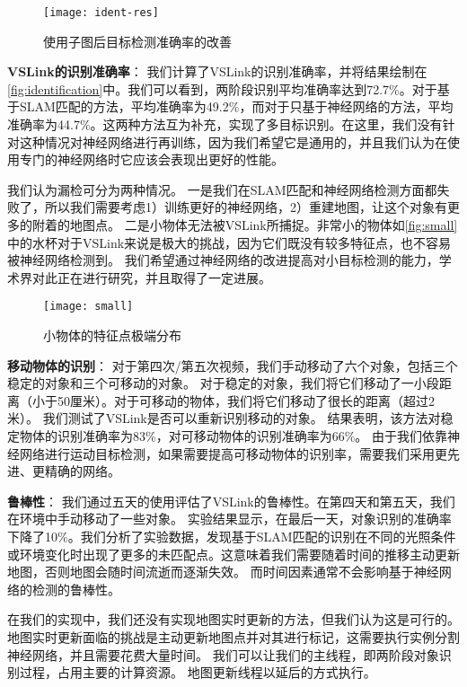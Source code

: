 \begin{figure*}[htbp]
	\centering
	\texttt{[image: ident-res]}
	\caption{使用子图后目标检测准确率的改善}
	\label{fig:identification}
\end{figure*}

\textbf{VSLink的识别准确率}：
我们计算了VSLink的识别准确率，并将结果绘制在\autoref{fig:identification}中。我们可以看到，两阶段识别平均准确率达到72.7\%。对于基于SLAM匹配的方法，平均准确率为49.2\%，而对于只基于神经网络的方法，平均准确率为44.7\%。这两种方法互为补充，实现了多目标识别。在这里，我们没有针对这种情况对神经网络进行再训练，因为我们希望它是通用的，并且我们认为在使用专门的神经网络时它应该会表现出更好的性能。

我们认为漏检可分为两种情况。
一是我们在SLAM匹配和神经网络检测方面都失败了，所以我们需要考虑1）训练更好的神经网络，2）重建地图，让这个对象有更多的附着的地图点。
二是小物体无法被VSLink所捕捉。非常小的物体如\autoref{fig:small}中的水杯对于VSLink来说是极大的挑战，因为它们既没有较多特征点，也不容易被神经网络检测到。
我们希望通过神经网络的改进提高对小目标检测的能力，学术界对此正在进行研究，并且取得了一定进展。
\begin{figure}[htbp]
	\centering
	\texttt{[image: small]}
	\caption{小物体的特征点极端分布}
	\label{fig:small}
\end{figure}

\textbf{移动物体的识别}：
对于第四次/第五次视频，我们手动移动了六个对象，包括三个稳定的对象和三个可移动的对象。
对于稳定的对象，我们将它们移动了一小段距离（小于50厘米）。对于可移动的物体，我们将它们移动了很长的距离（超过2米）。
我们测试了VSLink是否可以重新识别移动的对象。
结果表明，该方法对稳定物体的识别准确率为83\%，对可移动物体的识别准确率为66\%。
由于我们依靠神经网络进行运动目标检测，如果需要提高可移动物体的识别率，需要我们采用更先进、更精确的网络。


\textbf{鲁棒性}：
我们通过五天的使用评估了VSLink的鲁棒性。在第四天和第五天，我们在环境中手动移动了一些对象。
实验结果显示，在最后一天，对象识别的准确率下降了10\%。我们分析了实验数据，发现基于SLAM匹配的识别在不同的光照条件或环境变化时出现了更多的未匹配点。这意味着我们需要随着时间的推移主动更新地图，否则地图会随时间流逝而逐渐失效。
而时间因素通常不会影响基于神经网络的检测的鲁棒性。

在我们的实现中，我们还没有实现地图实时更新的方法，但我们认为这是可行的。地图实时更新面临的挑战是主动更新地图点并对其进行标记，这需要执行实例分割神经网络，并且需要花费大量时间。
我们可以让我们的主线程，即两阶段对象识别过程，占用主要的计算资源。
地图更新线程以延后的方式执行。


